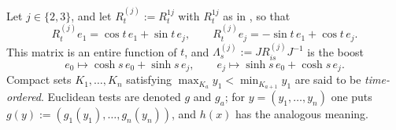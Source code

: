 \documentclass[11pt]{amsart}
\theoremstyle{definition}
\begin{document}
Let $j\in\{2,3\}$, and let $R^{(j)}_t:=R^{1j}_t$ with $R^{1j}_t$ as in \cite[Definition~14.1]{QEDII}, so that
\begin{equation*}
R^{(j)}_te_1=\cos t\,e_1+\sin t\,e_j,\qquad R^{(j)}_te_j=-\sin t\,e_1+\cos t\,e_j.
\end{equation*}
This matrix is an entire function of $t$, and $\Lambda^{(j)}_s:=JR^{(j)}_{is}J^{-1}$ is the boost
\begin{equation*}
e_0\mapsto\cosh s\,e_0+\sinh s\,e_j,\qquad e_j\mapsto\sinh s\,e_0+\cosh s\,e_j.
\end{equation*}
Compact sets $K_1,\dots,K_n$ satisfying $\max_{K_a}y_1<\min_{K_{a+1}}y_1$ are said to be \emph{time-ordered}.
Euclidean tests are denoted $g$ and $g_a$; for $y=(y_1,\dots,y_n)$ one puts $g(y):=(g_1(y_1),\dots,g_n(y_n))$, and $h(x)$ has the analogous meaning.
\end{document}
